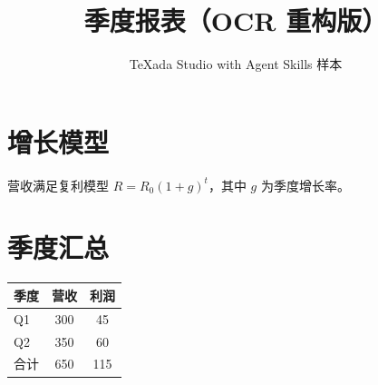 \documentclass[UTF8,fontset=fandol]{ctexart}
\title{季度报表（OCR 重构版）}
\author{TeXada Studio with Agent Skills 样本}
\date{}
\begin{document}
\maketitle
\section{增长模型}
营收满足复利模型 $R = R_0(1+g)^t$，其中 $g$ 为季度增长率。
\section{季度汇总}
\begin{tabular}{|l|c|c|}
\hline
季度 & 营收 & 利润 \\
\hline
Q1 & 300 & 45 \\
Q2 & 350 & 60 \\
\hline
合计 & 650 & 115 \\
\hline
\end{tabular}
\end{document}

